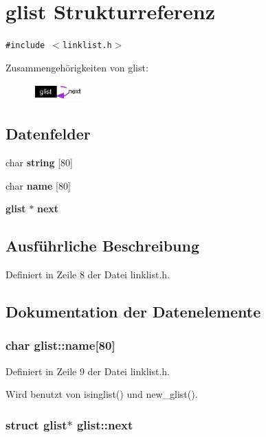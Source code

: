 \section{glist Strukturreferenz}
\label{structglist}
{\tt \#include $<$linklist.h$>$}

Zusammengeh\"{o}rigkeiten von glist:\begin{figure}[H]
\begin{center}
\leavevmode
\includegraphics[width=54pt]{structglist__coll__graph}
\end{center}
\end{figure}
\subsection*{Datenfelder}
\begin{CompactItemize}
\item 
char {\bf string} [80]
\item 
char {\bf name} [80]
\item 
{\bf glist} $\ast$ {\bf next}
\end{CompactItemize}


\subsection{Ausf\"{u}hrliche Beschreibung}




Definiert in Zeile 8 der Datei linklist.h.

\subsection{Dokumentation der Datenelemente}
\subsubsection{\setlength{\rightskip}{0pt plus 5cm}char {\bf glist::name}[80]}\label{structglist_d3ebdbe9d3d9448d753a3aa95d232455}




Definiert in Zeile 9 der Datei linklist.h.

Wird benutzt von isinglist() und new\_\-glist().
\subsubsection{\setlength{\rightskip}{0pt plus 5cm}struct {\bf glist}$\ast$ {\bf glist::next}}\label{structglist_fcbd6d229e8a0ea95ed0532927a3bf85}




